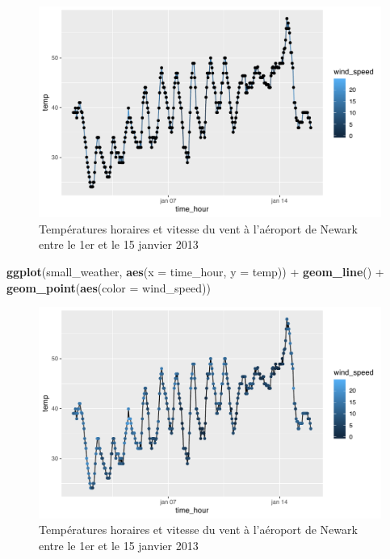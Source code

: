 \documentclass[a4paperpaper,]{article}
\newenvironment{Shaded}{\begin{snugshade}}{\end{snugshade}}
\newcommand{\DataTypeTok}[1]{\textcolor[rgb]{0.00,0.34,0.68}{#1}}
\newcommand{\KeywordTok}[1]{\textcolor[rgb]{0.12,0.11,0.11}{\textbf{#1}}}
\newcommand{\NormalTok}[1]{\textcolor[rgb]{0.12,0.11,0.11}{#1}}
\newcommand{\OperatorTok}[1]{\textcolor[rgb]{0.12,0.11,0.11}{#1}}
\newcommand{\StringTok}[1]{\textcolor[rgb]{0.75,0.01,0.01}{#1}}
\theoremstyle{definition}
\theoremstyle{definition}
\theoremstyle{definition}
\theoremstyle{remark}
\begin{document}
\begin{figure}[htpb]

{\centering \includegraphics[width=0.9\linewidth]{figure/wind2-1} 

}

\caption{Températures horaires et vitesse du vent à l'aéroport de Newark entre le 1er et le 15 janvier 2013}\label{fig:wind2}
\end{figure}

\begin{Shaded}
\begin{Highlighting}[]
\KeywordTok{ggplot}\NormalTok{(small_weather, }\KeywordTok{aes}\NormalTok{(}\DataTypeTok{x =}\NormalTok{ time_hour, }\DataTypeTok{y =}\NormalTok{ temp)) }\OperatorTok{+}
\StringTok{  }\KeywordTok{geom_line}\NormalTok{() }\OperatorTok{+}
\StringTok{  }\KeywordTok{geom_point}\NormalTok{(}\KeywordTok{aes}\NormalTok{(}\DataTypeTok{color =}\NormalTok{ wind_speed))}
\end{Highlighting}
\end{Shaded}

\begin{figure}[htpb]

{\centering \includegraphics[width=0.9\linewidth]{figure/wind3-1} 

}

\caption{Températures horaires et vitesse du vent à l'aéroport de Newark entre le 1er et le 15 janvier 2013}\label{fig:wind3}
\end{figure}
\end{document}
